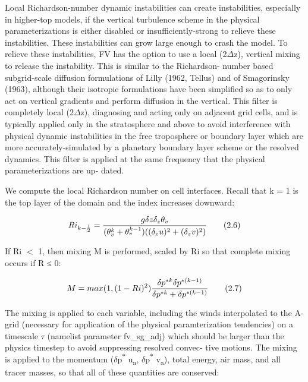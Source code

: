 Local Richardson-\/number dynamic instabilities can create instabilities, especially in higher-\/top models, if the vertical turbulence scheme in the physical parameterizations is either disabled or insufficiently-\/strong to relieve these instabilities. These instabilities can grow large enough to crash the model. To relieve these instabilities, FV\textthreesuperior{} has the option to use a local (2{$\Delta$}z), vertical mixing to release the instability. This is similar to the Richardson-\/ number based subgrid-\/scale diffusion formulations of Lilly (1962, Tellus) and of Smagorinsky (1963), although their isotropic formulations have been simplified so as to only act on vertical gradients and perform diffusion in the vertical. This filter is completely local (2{$\Delta$}z), diagnosing and acting only on adjacent grid cells, and is typically applied only in the stratosphere and above to avoid interference with physical dynamic instabilities in the free troposphere or boundary layer which are more accurately-\/simulated by a planetary boundary layer scheme or the resolved dynamics. This filter is applied at the same frequency that the physical parameterizations are up-\/ dated.

We compute the local Richardson number on cell interfaces. Recall that k = 1 is the top layer of the domain and the index increases downward\+:

\[ Ri_{k-\frac{1}{2}} = \frac{g\delta z\delta_z\theta_v}{(\theta^{k}_{v}+\theta^{k-1}_{v})((\delta_z u)^2+(\delta_z v)^2)} \\ \tag {2.6} \]

If Ri $<$ 1, then mixing M is performed, scaled by Ri so that complete mixing occurs if R ≤ 0\+:

\[ M = max(1, (1-Ri)^2) \frac{\delta p^{*k}\delta p^{*(k-1)}}{\delta p^{*k} +\delta p^{*(k-1)}} \\ \tag {2.7} \]

The mixing is applied to each variable, including the winds interpolated to the A-\/grid (necessary for application of the physical paramterization tendencies) on a timescale {$\tau$} (namelist parameter {\ttfamily fv\+\_\+sg\+\_\+adj}) which should be larger than the physics timestep to avoid suppressing resolved convec-\/ tive motions. The mixing is applied to the momentum ({$\delta$}p\textsuperscript{$\ast$} u\textsubscript{a}, {$\delta$}p\textsuperscript{$\ast$} v\textsubscript{a}), total energy, air mass, and all tracer masses, so that all of these quantities are conserved\+:

